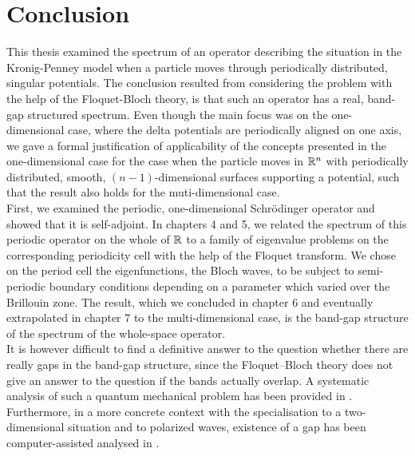 \chapter{Conclusion} \label{chap:8}
	
This thesis examined the spectrum of an operator describing the situation in the Kronig-Penney model when a particle moves through periodically distributed, singular potentials. The conclusion resulted from considering the problem with the help of the Floquet-Bloch theory, is that such an operator has a real, band-gap structured spectrum. Even though the main focus was on the one-dimensional case, where the delta potentials are periodically aligned on one axis, we gave a formal justification of applicability of the concepts presented in the one-dimensional case for the case when the particle moves in $\mathbb{R}^{n}$ with periodically distributed, smooth, $(n-1)$-dimensional surfaces supporting a potential, such that the result also holds for the muti-dimensional case. 
~\\

First, we examined the periodic, one-dimensional Schrödinger operator and showed that it is self-adjoint. In chapters 4 and 5, we related the spectrum of this periodic operator on the whole of $\mathbb{R}$ to a family of eigenvalue problems on the corresponding periodicity cell with the help of the Floquet transform. We chose on the period cell the eigenfunctions, the Bloch waves, to be subject to semi-periodic boundary conditions depending on a parameter which varied over the Brillouin zone. The result, which we concluded in chapter 6 and eventually extrapolated in chapter 7 to the multi-dimensional case, is the band-gap structure of the spectrum of the whole-space operator.
~\\

It is however difficult to find a definitive answer to the question whether there are really gaps in the band-gap structure, since the Floquet–Bloch theory does not give an answer to the question if the bands actually overlap. A systematic analysis of such a quantum mechanical problem has been provided in \cite{albeverio2012solvable}. Furthermore, in a more concrete context with the specialisation to a two-dimensional situation and to polarized waves, existence of a gap has been computer-assisted analysed in \cite{hoang2009computer}. 
~\\

